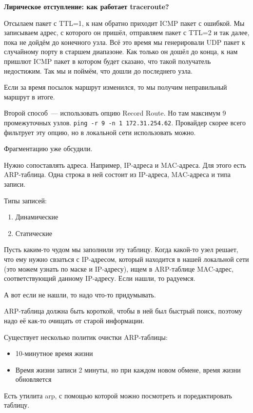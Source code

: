{\bf Лирическое отступление: как работает traceroute?}

Отсылаем пакет с TTL=1, к нам обратно приходит ICMP пакет с ошибкой. Мы записываем адрес, с которого он пришёл, отправляем пакет с TTL=2 и так далее, пока не дойдём до конечного узла. Всё это время мы генерировали UDP пакет к случайному порту в старшем диапазоне. Как только он дошёл до конца, к нам пришлют ICMP пакет в котором будет сказано, что такой получатель недостижим. Так мы и поймём, что дошли до последнего узла.

Если за время посылок маршрут изменился, то мы получим неправильный маршрут в итоге.

Второй способ~--- использовать опцию Record Route. Но там максимум 9 промежуточных узлов. {\tt ping -r 9 -n 1 172.31.254.62}. Провайдер скорее всего фильтрует эту опцию, но в локальной сети использовать можно.


Фрагментацию уже обсудили.

Нужно сопоставлять адреса. Например, IP-адреса и MAC-адреса. Для этого есть ARP-таблица. Одна строка в ней состоит из IP-адреса, MAC-адреса и типа записи. 

Типы записей:
\begin{enumerate}
    \item Динамические
    \item Статические
\end{enumerate}

Пусть каким-то чудом мы заполнили эту таблицу. Когда какой-то узел решает, что ему нужно свзаться с IP-адресом, который находится в нашей локальной сети (это можем узнать по маске и IP-адресу), ищем в ARP-таблице MAC-адрес, соответствующий данному IP-адресу. Если нашли, то радуемся. 

А вот если не нашли, то надо что-то придумывать.

ARP-таблица должна быть короткой, чтобы в ней был быстрый поиск, поэтому надо её как-то очищать от старой информации. 

Существует несколько политик очистки ARP-таблицы:
\begin{itemize}
    \item 10-минутное время жизни
    \item Время жизни записи 2 минуты, но при каждом новом обмене, время жизни обновляется
\end{itemize}

Есть утилита arp, с помощью которой можно посмотреть и поредактировать таблицу.

